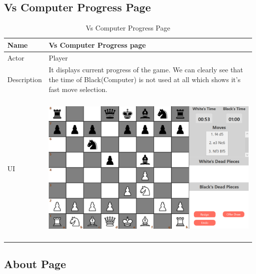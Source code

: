 \documentclass[a4paper,12pt]{article}
\begin{document}
\subsection{Vs Computer Progress Page}

\begin{longtable}{|m{}|m{}|}
    \caption{Vs Computer Progress Page} \\
    \hline
    Name & Vs Computer Progress page \\
    \hline
    Actor & Player \\
    \hline
    Description & It displays current progress of the game. We can clearly see that the time of Black(Computer) is not used at all which shows it's fast move selection. \\ 
    \hline
    \centering UI & 
    \begin{center}
        \includegraphics[height=2.7in]{Images/Use Cases/vsComputerProgress.png}
    \end{center} \\ 
    \hline
\end{longtable}

\subsection{About Page}
\end{document}
